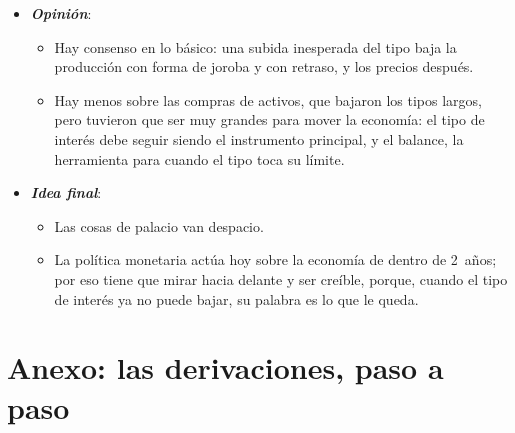 \documentclass[11pt]{article}
\begin{document}
\begin{itemize}
\begin{itemize}
  \item Un euro digital remunerado, si llegara, abriría un canal directo del tipo oficial al público .
  \end{itemize}
\item \textbf{\emph{Opinión}}:
  \begin{itemize}
  \item Hay consenso en lo básico: una subida inesperada del tipo baja la producción con forma de joroba y con retraso, y los precios después.

  \item Hay menos sobre las compras de activos, que bajaron los tipos largos, pero tuvieron que ser muy grandes para mover la economía\nocite{Walsh2017Monetary}: el tipo de interés debe seguir siendo el instrumento principal, y el balance, la herramienta para cuando el tipo toca su límite.
  \end{itemize}
\item \textbf{\emph{Idea final}}:
  \begin{itemize}
  \item Las cosas de palacio van despacio.

  \item La política monetaria actúa hoy sobre la economía de dentro de 2~años; por eso tiene que mirar hacia delante y ser creíble, porque, cuando el tipo de interés ya no puede bajar, su palabra es lo que le queda.
  \end{itemize}
\end{itemize}

\clearpage
\appendix

\section{Anexo: las derivaciones, paso a paso}\label{anexo:contratos}
\end{document}
